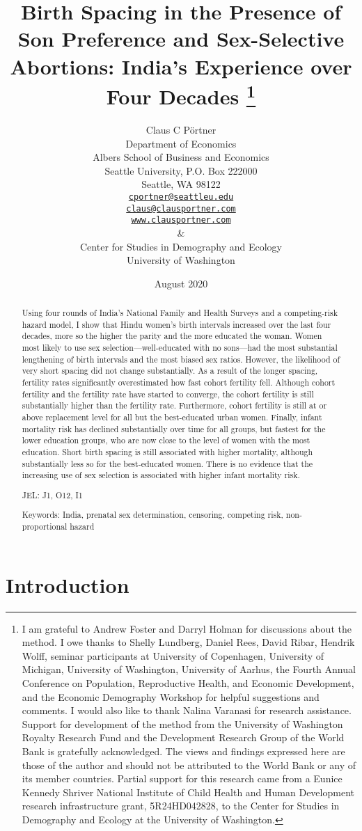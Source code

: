 \documentclass[12pt,letterpaper]{article}
\title{Birth Spacing in the Presence of Son Preference and Sex-Selective Abortions:
India's Experience over Four Decades%
\protect\thanks{%
I am grateful to Andrew Foster and Darryl Holman for discussions about the method.
I owe thanks to Shelly Lundberg, Daniel Rees, David Ribar, 
Hendrik Wolff, seminar participants at University of Copenhagen, University of Michigan, 
University of Washington, University of Aarhus, the Fourth 
Annual Conference on Population, Reproductive Health, 
and Economic Development, and the Economic Demography Workshop for helpful 
suggestions and comments.
I would also like to thank Nalina Varanasi for research assistance.
Support for development of the method from the University of Washington Royalty 
Research Fund and the Development Research Group of the World Bank is gratefully 
acknowledged.
The views and findings expressed here are those of the author and
should not be attributed to the World Bank or any of its member countries.
Partial support for this research came from a Eunice Kennedy Shriver National
Institute of Child Health and Human Development research infrastructure grant,
5R24HD042828, to the Center for Studies in Demography and Ecology at the
University of Washington.
}
}
\author{Claus C P\"ortner\\
    Department of Economics\\
    Albers School of Business and Economics\\
    Seattle University, P.O. Box 222000\\
    Seattle, WA 98122\\
    \href{mailto:cportner@seattleu.edu}{\texttt{cportner@seattleu.edu}}\\
    \href{mailto:claus@clausportner.com}{\texttt{claus@clausportner.com}}\\
    \href{http://www.clausportner.com}{\texttt{www.clausportner.com}}\\
    \& \\
    Center for Studies in Demography and Ecology \\
    University of Washington\\ \vspace{2cm}
    }
\date{August 2020}
\begin{document}
\graphicspath{{../figures/}}

\setcounter{page}{-1}
\maketitle
\thispagestyle{empty}



\newpage
\thispagestyle{empty}
\doublespacing

\begin{abstract}

\noindent 
Using four rounds of India's National Family and Health Surveys and a
competing-risk hazard model, I show that Hindu women's birth intervals
increased over the last four decades, more so the higher the parity and
the more educated the woman. 
Women most likely to use sex selection---well-educated with no sons---had the most 
substantial lengthening of birth intervals and the most biased sex ratios. 
However, the likelihood of very short spacing did not change substantially. 
As a result of the longer spacing, fertility rates significantly
overestimated how fast cohort fertility fell. 
Although cohort fertility
and the fertility rate have started to converge, the cohort fertility is
still substantially higher than the fertility rate. 
Furthermore, cohort fertility is still at or above replacement level for all but the
best-educated urban women. 
Finally, infant mortality risk has declined substantially over time for all groups, but 
fastest for the lower education groups, who are now close to the level of women with the most
education. 
Short birth spacing is still associated with higher mortality, although substantially less 
so for the best-educated women. 
There is no evidence that the increasing use of sex selection is associated with
higher infant mortality risk.

\noindent JEL: J1, O12, I1

\noindent Keywords: India, prenatal sex determination, censoring, competing risk, 
non-proportional hazard
\end{abstract}

\newpage



\section{Introduction\label{sec:intro}}
\end{document}

